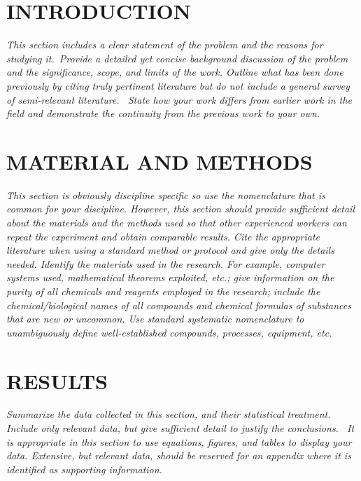 \documentclass[
]{article}
\begin{document}
    \hypertarget{introduction}{%


        \section{INTRODUCTION}\label{introduction}}

    \emph{This section includes a clear statement of the problem and the
    reasons for studying it.~Provide a detailed yet concise background
    discussion of the problem and the significance, scope, and limits of the
    work. Outline what has been done previously by citing truly pertinent
    literature but do not include a general survey of semi-relevant
    literature.~ State how your work differs from earlier work in the field
    and demonstrate the continuity from the previous work to your own.}

    \hypertarget{material-and-methods}{%


        \section{MATERIAL AND METHODS}\label{material-and-methods}}

    \emph{This section is obviously discipline specific so use the
    nomenclature that is common for your discipline. However, this section
    should provide sufficient detail about the materials and the methods
    used so that other experienced workers can repeat the experiment and
    obtain comparable results. Cite the appropriate literature when using a
    standard method or protocol and give only the details needed. Identify
    the materials used in the research. For example, computer systems used,
        mathematical theorems exploited, etc.; give information on the purity of
        all chemicals and reagents employed in the research; include the
        chemical/biological names of all compounds and chemical formulas of
        substances that are new or uncommon. Use standard systematic
        nomenclature to unambiguously define well-established compounds,
        processes, equipment, etc.}

    \hypertarget{results}{%


        \section{RESULTS}\label{results}}

    \emph{Summarize the data collected in this section, and their
    statistical treatment. Include only relevant data, but give sufficient
    detail to justify the conclusions.~ It is appropriate in this section to
    use equations, figures, and tables to display your data. Extensive, but
    relevant data, should be reserved for an appendix where it is identified
    as supporting information.}
\end{document}
